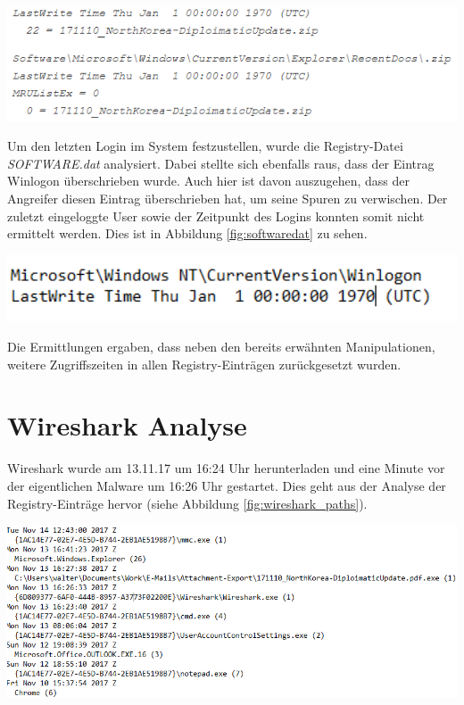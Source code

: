 \begin{center}
	\includegraphics[width=15.8cm]{figures/prefetch_manipulation.png}
	\label{fig:RecentDocs}
\end{center}

\newpage
Um den letzten Login im System festzustellen, wurde die Registry-Datei \textit{SOFTWARE.dat} analysiert.
Dabei stellte sich ebenfalls raus, dass der Eintrag Winlogon überschrieben wurde.
Auch hier ist davon auszugehen, dass der Angreifer diesen Eintrag überschrieben hat, um seine Spuren zu verwischen.
Der zuletzt eingeloggte User sowie der Zeitpunkt des Logins konnten somit nicht ermittelt werden. Dies ist in Abbildung \ref{fig:softwaredat} zu sehen.

\begin{center}
	\includegraphics[width=15.8cm]{figures/softwaredat.png}
	\label{fig:softwaredat}
\end{center}

Die Ermittlungen ergaben, dass neben den bereits erwähnten Manipulationen, weitere Zugriffszeiten in allen Registry-Einträgen zurückgesetzt wurden.

\section{Wireshark Analyse}
Wireshark wurde am 13.11.17 um 16:24 Uhr herunterladen und eine Minute vor der eigentlichen Malware um 16:26 Uhr gestartet.
Dies geht aus der Analyse der Registry-Einträge hervor (siehe Abbildung \ref{fig:wireshark_paths}).

\begin{center}
	\includegraphics[width=15.8cm]{figures/wireshark_paths.png}
	\label{fig:wireshark_paths}
\end{center}

